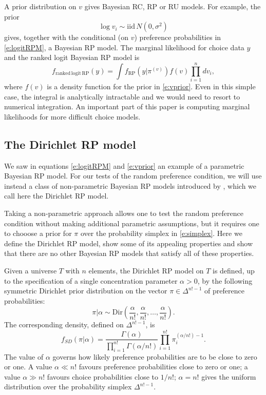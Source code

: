 \documentclass[11pt,letter]{article}
\newcommand{\Dpi}{Dirichlet RP model}
\begin{document}
A prior distribution on $v$ gives Bayesian RC, RP or RU models.
For example, the prior
\begin{equation}\label{e:vprior}
  \log v_i \sim \mathrm{iid}\,N(0,\sigma^2)
\end{equation}
gives, together with the conditional (on $v$) preference probabilities in \eqref{e:logitRPM}, a Bayesian RP model.
The marginal likelihood for choice data $y$ and the ranked logit Bayesian RP model is
\[
  f_{\mathrm{ranked\,logit\,RP}}(y) = \int f_{\mathrm{RP}}(y|\pi^{(v)}) f(v) \prod_{i=1}^n dv_i,
\]
where $f(v)$ is a density function for the prior in \eqref{e:vprior}.
Even in this simple case, the integral is analytically intractable and we would need to resort to numerical integration.
An important part of this paper is computing marginal likelihoods for more difficult choice models.

\subsection{The \Dpi{}}\label{s:Dpi}

We saw in equations \eqref{e:logitRPM} and \eqref{e:vprior} an example of a parametric Bayesian RP model.
For our tests of the random preference condition, we will use instead a class of non-parametric Bayesian RP models introduced by , which we call here  the \Dpi{}.

Taking a non-parametric approach allows one to test the random preference condition without making additional parametric assumptions, but it requires one to chooose a prior for $\pi$ over the probability simplex in \eqref{e:simplex}.
Here we define the \Dpi{}, show some of its appealing properties and show that there are no other Bayesian RP models that satisfy all of these properties.

Given a universe $T$ with $n$ elements, the \Dpi{} on $T$ is defined, up to the specification of a single concentration parameter $\alpha > 0$, by the following symmetric Dirichlet prior distribution on the vector $\pi \in \Delta^{n!-1}$ of preference probabilities:
\begin{equation}\label{e:Dirpi}
  \pi|\alpha \sim \mathrm{Dir}\left( \frac{\alpha}{n!}, \frac{\alpha}{n!}, \ldots, \frac{\alpha}{n!} \right).
\end{equation}
The corresponding density, defined on $\Delta^{n!-1}$, is
\begin{equation}\label{e:priorpi}
  f_{SD}(\pi|\alpha) = \frac{\Gamma(\alpha)}{\prod_{i=1}^{n!} \Gamma(\alpha/n!)}
  \prod_{i=1}^{n!} \pi_i^{(\alpha/n!) - 1}.
\end{equation}
The value of $\alpha$ governs how likely preference probabilities are to be close to zero or one.
A value $\alpha \ll n!$ favours preference probabilities close to zero or one; a value $\alpha \gg n!$ favours choice probabilities close to $1/n!$; $\alpha=n!$ gives the uniform distribution over the probability simplex $\Delta^{n!-1}$.
\end{document}
